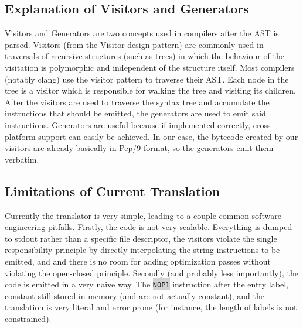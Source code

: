 \documentclass[12pt]{article}
\newcommand{\code}[1]{\colorbox{LightGray}{\texttt{#1}}}
\begin{document}
\subsection*{Explanation of Visitors and Generators}
Visitors and Generators are two concepts used in compilers after the AST is parsed. Visitors (from the Visitor design pattern) are commonly used in traversals of recursive structures (such as trees) in which the behaviour of the visitation is polymorphic and independent of the structure itself. Most compilers (notably clang) use the visitor pattern to traverse their AST. Each node in the tree is a visitor which is responsible for walking the tree and visiting its children. After the visitors are used to traverse the syntax tree and accumulate the instructions that should be emitted, the generators are used to emit said instructions. Generators are useful because if implemented correctly, cross platform support can easily be achieved. In our case, the bytecode created by our visitors are already basically in Pep/9 format, so the generators emit them verbatim.

\subsection*{Limitations of Current Translation}
Currently the translator is very simple, leading to a couple common software engineering pitfalls. Firstly, the code is not very scalable. Everything is dumped to stdout rather than a specific file descriptor, the visitors violate the single responsibility principle by directly interpolating the string instructions to be emitted, and and there is no room for adding optimization passes without violating the open-closed principle. Secondly (and probably less importantly), the code is emitted in a very naive way. The \code{NOP1} instruction after the entry label, constant still stored in memory (and are not actually constant), and the translation is very literal and error prone (for instance, the length of labels is not constrained).
\end{document}
